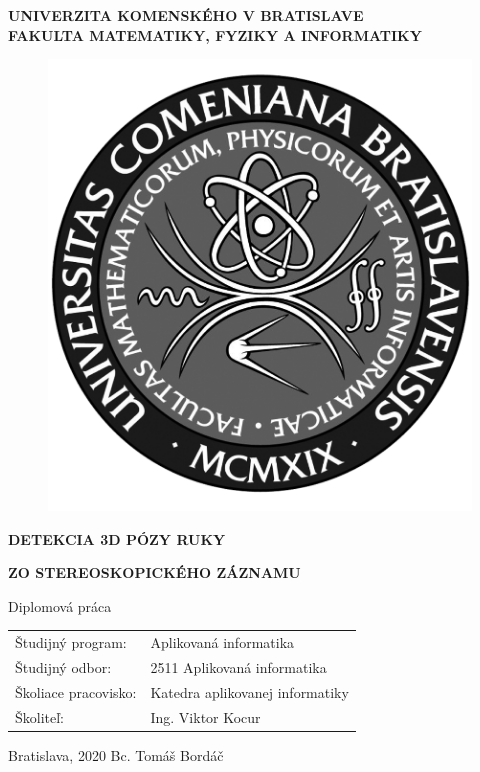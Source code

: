 \documentclass[12pt, a4paper, oneside]{book}
\newcommand\mftitleO{Detekcia 3D pózy ruky}
\newcommand\mftitleT{zo stereoskopického záznamu}
\newcommand\mfthesistype{Diplomová práca}
\newcommand\mfauthor{Bc. Tomáš Bordáč}
\newcommand\mfadvisor{Ing. Viktor Kocur}
\newcommand\thisYear{2020}
\newcommand\mfplacedate{Bratislava, \thisYear}
\newcommand\mfuniversity{UNIVERZITA KOMENSKÉHO V BRATISLAVE}
\newcommand\mffaculty{FAKULTA MATEMATIKY, FYZIKY A INFORMATIKY}
\begin{document}
\noindent
\begin{minipage}{\textwidth}
\begin{center}
\textbf{\mfuniversity \\
\mffaculty}
\end{center}
\end{minipage}

\vfill
\begin{figure}[!hbt]
\begin{center}
\includegraphics{images/logo_fmph_dark}
\label{img:logo_dark}
\end{center}
\end{figure}
\begin{center}
\begin{minipage}{0.8\textwidth}
\centerline{\textbf{\Large\MakeUppercase{\mftitleO}}}
\centerline{\textbf{\Large\MakeUppercase{\mftitleT}}}
\smallskip
\centerline{\mfthesistype}
\end{minipage}
\end{center}
\vfill
\begin{tabular}{l l}
Študijný program: & Aplikovaná informatika\\
Študijný odbor: & 2511 Aplikovaná informatika\\
Školiace pracovisko: & Katedra aplikovanej informatiky\\
Školiteľ: & \mfadvisor
\end{tabular}
\vfill
\noindent
\mfplacedate \hfill
\mfauthor
\eject 
\end{document}
